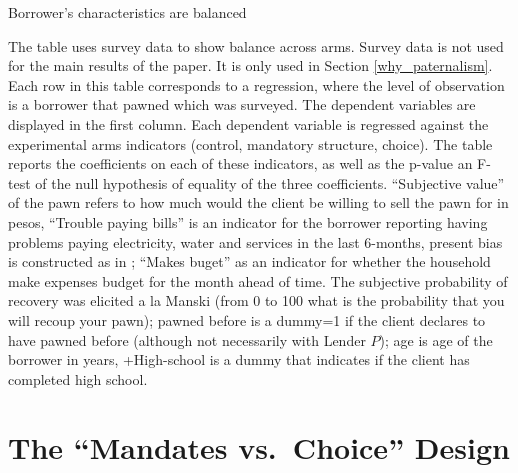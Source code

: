 \documentclass[12pt, a4paper, colorinlistoftodos]{article}
\begin{document}
\begin{table}[H]
\caption{Borrower's characteristics are balanced}
\label{SS_final}
\begin{center}
\resizebox{0.65\textwidth}{!}{
\footnotesize{}
}
\end{center}
\scriptsize {The table uses survey data to show balance across arms. Survey data is not used for the main results of the paper. It is only used in Section \ref{why_paternalism}. Each row in this table corresponds to a regression, where the level of observation is a borrower that pawned which was surveyed.  The dependent variables are displayed in the first column. Each dependent variable is regressed against the experimental arms indicators (control, mandatory structure, choice). The table reports the coefficients on each of these indicators, as well as the p-value an F-test of the null hypothesis of equality of the three coefficients. ``Subjective value'' of the pawn refers to how much would the client be willing to sell the pawn for in pesos, ``Trouble paying bills'' is an indicator for the borrower reporting having problems paying electricity, water and services in the last 6-months, present bias is constructed as in \cite{Ashraf}; ``Makes buget'' as an indicator for whether the household make expenses budget for the month ahead of time. The subjective probability of recovery was elicited a la Manski (from 0 to 100 what is the probability that you will recoup your pawn); pawned before is a dummy=1 if the client declares to have pawned before (although not necessarily with Lender $P$); age is age of the borrower in years, +High-school is a dummy that indicates if the client has completed high school. 
}
\end{table}



\section{The ``Mandates vs.\ Choice'' Design}
\label{sec:randchoice}

\end{document}
